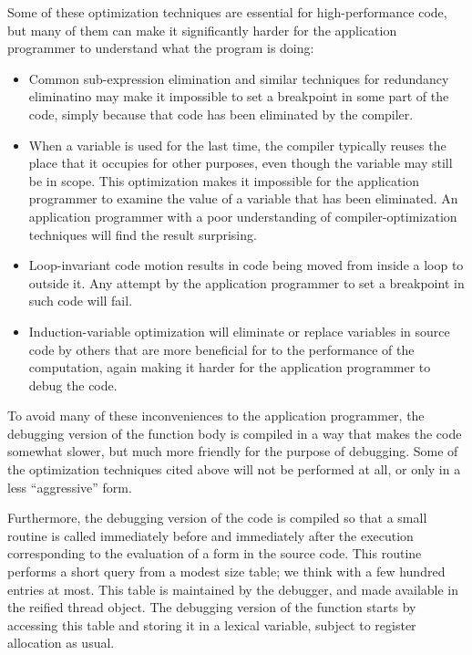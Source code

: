 Some of these optimization techniques are essential for
high-performance code, but many of them can make it significantly
harder for the application programmer to understand what the
program is doing:

\begin{itemize}
\item Common sub-expression elimination and similar techniques for
  redundancy eliminatino may make it impossible to set
  a breakpoint in some part of the code, simply because that code has
  been eliminated by the compiler.
\item When a variable is used for the last time, the compiler
  typically reuses the place that it occupies for other purposes, even
  though the variable may still be in scope.  This optimization makes
  it impossible for the application programmer to examine the value of
  a variable that has been eliminated.  An application programmer with
  a poor understanding of compiler-optimization techniques will find
  the result surprising.
\item Loop-invariant code motion results in code being moved from
  inside a loop to outside it.  Any attempt by the application
  programmer to set a breakpoint in such code will fail.
\item Induction-variable optimization will eliminate or replace
  variables in source code by others that are more beneficial for to
  the performance of the computation, again making it harder for the
  application programmer to debug the code.
\end{itemize}

To avoid many of these inconveniences to the application programmer,
the debugging version of the function body is compiled in a way that
makes the code somewhat slower, but much more friendly for the purpose
of debugging.  Some of the optimization techniques cited above will
not be performed at all, or only in a less ``aggressive'' form.

Furthermore, the debugging version of the code is compiled so that a
small routine is called immediately before and immediately after the
execution corresponding to the evaluation of a form in the source
code.  This routine performs a short query from a modest size table;
we think with a few hundred entries at most.  This table is maintained
by the debugger, and made available in the reified thread object.  The
debugging version of the function starts by accessing this table and
storing it in a lexical variable, subject to register allocation as
usual.

